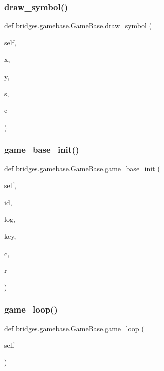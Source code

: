\subsubsection{\texorpdfstring{draw\_symbol()}{draw\_symbol()}}
{\footnotesize\ttfamily def bridges.\+gamebase.\+Game\+Base.\+draw\+\_\+symbol (\begin{DoxyParamCaption}\item[{}]{self,  }\item[{}]{x,  }\item[{}]{y,  }\item[{}]{s,  }\item[{}]{c }\end{DoxyParamCaption})}

\mbox{\label{classbridges_1_1gamebase_1_1_game_base_ad0d97def82fd9c51fd7beed609663d50}} 
\subsubsection{\texorpdfstring{game\_base\_init()}{game\_base\_init()}}
{\footnotesize\ttfamily def bridges.\+gamebase.\+Game\+Base.\+game\+\_\+base\+\_\+init (\begin{DoxyParamCaption}\item[{}]{self,  }\item[{}]{id,  }\item[{}]{log,  }\item[{}]{key,  }\item[{}]{c,  }\item[{}]{r }\end{DoxyParamCaption})}

\mbox{\label{classbridges_1_1gamebase_1_1_game_base_af650eeb756558d2cbcae43c74de5cce7}} 
\subsubsection{\texorpdfstring{game\_loop()}{game\_loop()}}
{\footnotesize\ttfamily def bridges.\+gamebase.\+Game\+Base.\+game\+\_\+loop (\begin{DoxyParamCaption}\item[{}]{self }\end{DoxyParamCaption})}

